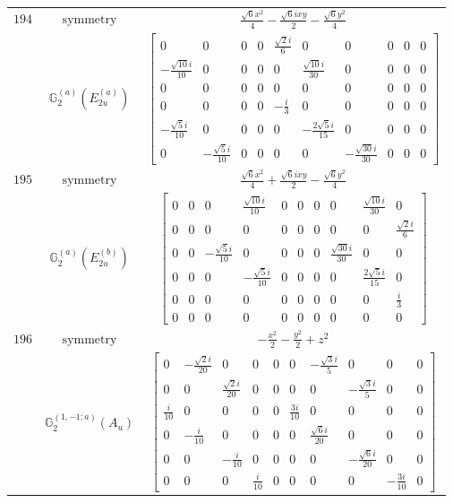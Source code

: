 \documentclass[fleqn,8pt,landscape]{jsarticle}
\begin{document}
\begin{longtable}{ccc}
$ 194 $ & $ \text{symmetry} $ & $ \frac{\sqrt{6} x^{2}}{4} - \frac{\sqrt{6} i x y}{2} - \frac{\sqrt{6} y^{2}}{4} $ \\
$  $ & $ \mathbb{G}_{2}^{(a)}(E_{2u}^{(a)}) $ & $ \begin{bmatrix} 0 & 0 & 0 & 0 & \frac{\sqrt{2} i}{6} & 0 & 0 & 0 & 0 & 0 \\ - \frac{\sqrt{10} i}{10} & 0 & 0 & 0 & 0 & \frac{\sqrt{10} i}{30} & 0 & 0 & 0 & 0 \\ 0 & 0 & 0 & 0 & 0 & 0 & 0 & 0 & 0 & 0 \\ 0 & 0 & 0 & 0 & - \frac{i}{3} & 0 & 0 & 0 & 0 & 0 \\ - \frac{\sqrt{5} i}{10} & 0 & 0 & 0 & 0 & - \frac{2 \sqrt{5} i}{15} & 0 & 0 & 0 & 0 \\ 0 & - \frac{\sqrt{5} i}{10} & 0 & 0 & 0 & 0 & - \frac{\sqrt{30} i}{30} & 0 & 0 & 0 \end{bmatrix} $ \\ \hline
$ 195 $ & $ \text{symmetry} $ & $ \frac{\sqrt{6} x^{2}}{4} + \frac{\sqrt{6} i x y}{2} - \frac{\sqrt{6} y^{2}}{4} $ \\
$  $ & $ \mathbb{G}_{2}^{(a)}(E_{2u}^{(b)}) $ & $ \begin{bmatrix} 0 & 0 & 0 & \frac{\sqrt{10} i}{10} & 0 & 0 & 0 & 0 & \frac{\sqrt{10} i}{30} & 0 \\ 0 & 0 & 0 & 0 & 0 & 0 & 0 & 0 & 0 & \frac{\sqrt{2} i}{6} \\ 0 & 0 & - \frac{\sqrt{5} i}{10} & 0 & 0 & 0 & 0 & \frac{\sqrt{30} i}{30} & 0 & 0 \\ 0 & 0 & 0 & - \frac{\sqrt{5} i}{10} & 0 & 0 & 0 & 0 & \frac{2 \sqrt{5} i}{15} & 0 \\ 0 & 0 & 0 & 0 & 0 & 0 & 0 & 0 & 0 & \frac{i}{3} \\ 0 & 0 & 0 & 0 & 0 & 0 & 0 & 0 & 0 & 0 \end{bmatrix} $ \\ \hline
$ 196 $ & $ \text{symmetry} $ & $ - \frac{x^{2}}{2} - \frac{y^{2}}{2} + z^{2} $ \\
$  $ & $ \mathbb{G}_{2}^{(1,-1;a)}(A_{u}) $ & $ \begin{bmatrix} 0 & - \frac{\sqrt{2} i}{20} & 0 & 0 & 0 & 0 & - \frac{\sqrt{3} i}{5} & 0 & 0 & 0 \\ 0 & 0 & \frac{\sqrt{2} i}{20} & 0 & 0 & 0 & 0 & - \frac{\sqrt{3} i}{5} & 0 & 0 \\ \frac{i}{10} & 0 & 0 & 0 & 0 & \frac{3 i}{10} & 0 & 0 & 0 & 0 \\ 0 & - \frac{i}{10} & 0 & 0 & 0 & 0 & \frac{\sqrt{6} i}{20} & 0 & 0 & 0 \\ 0 & 0 & - \frac{i}{10} & 0 & 0 & 0 & 0 & - \frac{\sqrt{6} i}{20} & 0 & 0 \\ 0 & 0 & 0 & \frac{i}{10} & 0 & 0 & 0 & 0 & - \frac{3 i}{10} & 0 \end{bmatrix} $ \\ \hline

\end{longtable}
\end{document}
